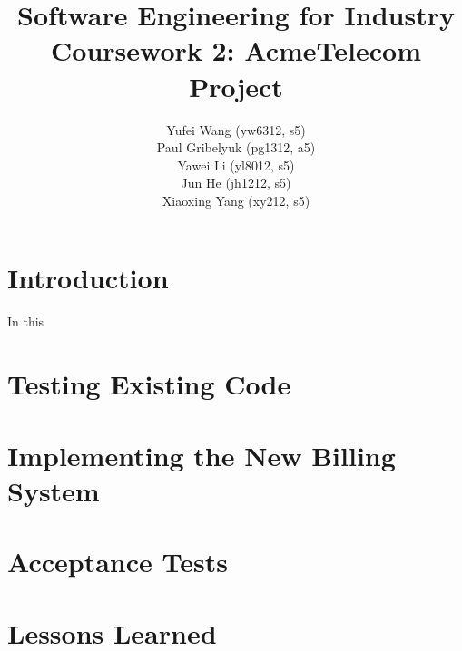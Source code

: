 \documentclass{report}
\author{
    Yufei Wang (yw6312, s5) \\ 
    Paul Gribelyuk (pg1312, a5) \\
    Yawei Li (yl8012, s5) \\ 
    Jun He (jh1212, s5) \\
    Xiaoxing Yang (xy212, s5)
}
\title{\Huge Software Engineering for Industry \\ Coursework 2: AcmeTelecom Project}
\begin{document}
\maketitle
\chapter{Introduction}
In this 
\chapter{Testing Existing Code}
\chapter{Implementing the New Billing System}
\chapter{Acceptance Tests}
\chapter{Lessons Learned}
\end{document}
